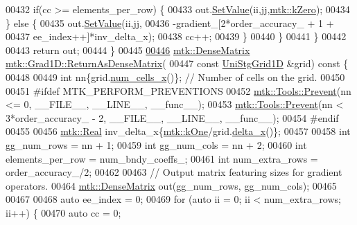 \begin{DoxyCode}
{{00432       \textcolor{keywordflow}{if}(cc >= elements\_per\_row) \{
00433         out.\hyperlink{classmtk_1_1DenseMatrix_a784ce5784109ac86bfb9d8562b334b13}{SetValue}(ii,jj,\hyperlink{group__c01-roots_ga59a451a5fae30d59649bcda274fea271}{mtk::kZero});
00434       \} \textcolor{keywordflow}{else} \{
00435         out.\hyperlink{classmtk_1_1DenseMatrix_a784ce5784109ac86bfb9d8562b334b13}{SetValue}(ii,jj,
00436                      -gradient\_[2*order\_accuracy\_ + 1 +
00437 ee\_index++]*inv\_delta\_x);
00438         cc++;
00439       \}
00440      \}
00441   \}
00442 
00443   \textcolor{keywordflow}{return} out;
00444 \}
00445 
\hypertarget{mtk__grad__1d_8cc_source_l00446}{}\hyperlink{classmtk_1_1Grad1D_a871a3b31e257b04d5e303b3211df3a73}{00446} \hyperlink{classmtk_1_1DenseMatrix}{mtk::DenseMatrix} \hyperlink{classmtk_1_1Grad1D_a77b2eddbe4ab03f469306c604d505b1a}{mtk::Grad1D::ReturnAsDenseMatrix}(
00447   \textcolor{keyword}{const} \hyperlink{classmtk_1_1UniStgGrid1D}{UniStgGrid1D} &grid)\textcolor{keyword}{ const }\{
00448 
00449   \textcolor{keywordtype}{int} nn\{grid.\hyperlink{classmtk_1_1UniStgGrid1D_af1b3729d8afa07be5b2775ed68015b80}{num\_cells\_x}()\}; \textcolor{comment}{// Number of cells on the grid.}
00450 
00451 \textcolor{preprocessor}{  #ifdef MTK\_PERFORM\_PREVENTIONS}
00452   \hyperlink{classmtk_1_1Tools_a332324c6f25e66be9dff48c5987a3b9f}{mtk::Tools::Prevent}(nn <= 0, \_\_FILE\_\_, \_\_LINE\_\_, \_\_func\_\_);
00453   \hyperlink{classmtk_1_1Tools_a332324c6f25e66be9dff48c5987a3b9f}{mtk::Tools::Prevent}(nn < 3*order\_accuracy\_ - 2, \_\_FILE\_\_, \_\_LINE\_\_, \_\_func\_\_);
00454 \textcolor{preprocessor}{  #endif}
00455 
00456   \hyperlink{group__c01-roots_gac080bbbf5cbb5502c9f00405f894857d}{mtk::Real} inv\_delta\_x\{\hyperlink{group__c01-roots_ga26407c24d43b6b95480943340d285c71}{mtk::kOne}/grid.\hyperlink{classmtk_1_1UniStgGrid1D_a6e7173b01241632cf509496d66b9f74c}{delta\_x}()\};
00457 
00458   \textcolor{keywordtype}{int} gg\_num\_rows = nn + 1;
00459   \textcolor{keywordtype}{int} gg\_num\_cols = nn + 2;
00460   \textcolor{keywordtype}{int} elements\_per\_row = num\_bndy\_coeffs\_;
00461   \textcolor{keywordtype}{int} num\_extra\_rows = order\_accuracy\_/2;
00462 
00463   \textcolor{comment}{// Output matrix featuring sizes for gradient operators.}
00464   \hyperlink{classmtk_1_1DenseMatrix}{mtk::DenseMatrix} out(gg\_num\_rows, gg\_num\_cols);
00465 
00467 
00468   \textcolor{keyword}{auto} ee\_index = 0;
00469   \textcolor{keywordflow}{for} (\textcolor{keyword}{auto} ii = 0; ii < num\_extra\_rows; ii++) \{
00470     \textcolor{keyword}{auto} cc = 0;
}}
\end{DoxyCode}
